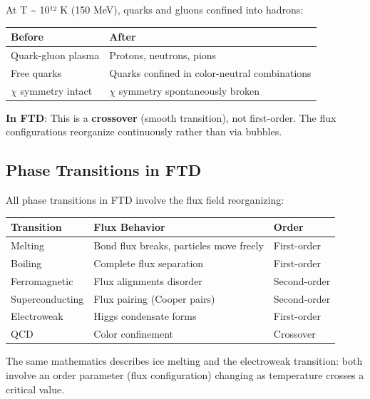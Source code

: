 \documentclass[
  11pt,
  letterpaper,
  twoside,
  openright]{book}
\begin{document}
At T \textasciitilde{} 10¹² K (150 MeV), quarks and gluons confined into
hadrons:

\begin{longtable}[]{@{}ll@{}}
\toprule\noalign{}
Before & After \\
\midrule\noalign{}
\endhead
\bottomrule\noalign{}
\endlastfoot
Quark-gluon plasma & Protons, neutrons, pions \\
Free quarks & Quarks confined in color-neutral combinations \\
\(\chi\) symmetry intact & \(\chi\) symmetry spontaneously broken \\
\end{longtable}

\textbf{In FTD}: This is a \textbf{crossover} (smooth transition), not
first-order. The flux configurations reorganize continuously rather than
via bubbles.

\subsection{Phase Transitions in FTD}\label{phase-transitions-in-ftd}

All phase transitions in FTD involve the flux field reorganizing:

\begin{longtable}[]{@{}lll@{}}
\toprule\noalign{}
Transition & Flux Behavior & Order \\
\midrule\noalign{}
\endhead
\bottomrule\noalign{}
\endlastfoot
Melting & Bond flux breaks, particles move freely & First-order \\
Boiling & Complete flux separation & First-order \\
Ferromagnetic & Flux alignments disorder & Second-order \\
Superconducting & Flux pairing (Cooper pairs) & Second-order \\
Electroweak & Higgs condensate forms & First-order \\
QCD & Color confinement & Crossover \\
\end{longtable}

\begin{tcolorbox}[enhanced jigsaw, leftrule=.75mm, title=\textcolor{quarto-callout-note-color}{\faInfo}\hspace{0.5em}{Universal Physics}, bottomrule=.15mm, opacityback=0, coltitle=black, arc=.35mm, colframe=quarto-callout-note-color-frame, colbacktitle=quarto-callout-note-color!10!white, colback=white, titlerule=0mm, breakable, bottomtitle=1mm, toptitle=1mm, rightrule=.15mm, toprule=.15mm, left=2mm, opacitybacktitle=0.6]

The same mathematics describes ice melting and the electroweak
transition: both involve an order parameter (flux configuration)
changing as temperature crosses a critical value.

\end{tcolorbox}
\end{document}
